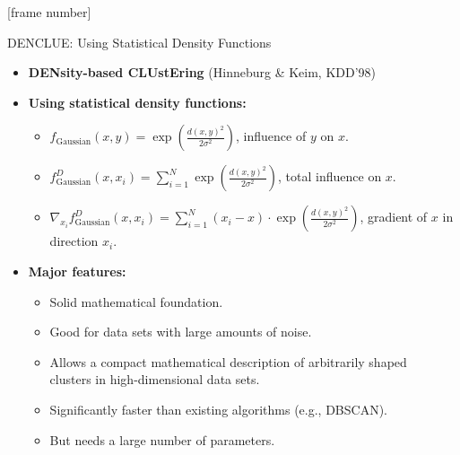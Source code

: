 \documentclass[aspectratio=169,t,xcolor=dvipsnames]{beamer}
\begin{document}
  {
    [frame number]
    \begin{frame}{DENCLUE: Using Statistical Density Functions}
      \begin{itemize}
        \item \textbf{DENsity-based CLUstEring} (Hinneburg \& Keim, KDD'98)
        \item \textbf{Using statistical density functions:}
        \begin{itemize}
          \item $f_{\text{Gaussian}}(x,y)= \exp\left(\frac{d(x,y)^2}{2\sigma^2}\right)$, influence of $y$ on $x$.
          \item $f^D_{\text{Gaussian}}(x,x_i)= \sum_{i=1}^{N} \exp\left(\frac{d(x,y)^2}{2\sigma^2}\right)$, total influence on $x$.
          \item $\nabla_{x_i} f^D_{\text{Gaussian}}(x,x_i) = \sum_{i=1}^{N} (x_i-x) \cdot \exp\left(\frac{d(x,y)^2}{2\sigma^2}\right)$, gradient of $x$ in direction $x_i$.
        \end{itemize}
        \item \textbf{Major features:}
        \begin{itemize}
          \item Solid mathematical foundation.
          \item Good for data sets with large amounts of noise.
          \item Allows a compact mathematical description of arbitrarily shaped \\
          clusters in high-dimensional data sets.
          \item Significantly faster than existing algorithms (e.g., DBSCAN).
          \item But needs a large number of parameters.
        \end{itemize}
      \end{itemize}
    \end{frame}
  }
\end{document}
